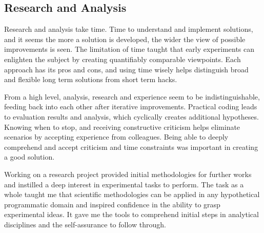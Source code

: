 \subsection{Research and Analysis}

Research and analysis take time. Time to understand and implement solutions, and it seems the more a solution is developed, the wider the view of possible improvements is seen. The limitation of time taught that early experiments can enlighten the subject by creating quantifiably comparable viewpoints. Each approach has its pros and cons, and using time wisely helps distinguish broad and flexible long term solutions from short term hacks. 

From a high level, analysis, research and experience seem to be indistinguishable, feeding back into each other after iterative improvements. Practical coding leads to evaluation results and analysis, which cyclically creates additional hypotheses. Knowing when to stop, and receiving constructive criticism helps eliminate scenarios by accepting experience from colleagues. Being able to deeply comprehend and accept criticism and time constraints was important in creating a good solution.

Working on a research project provided initial methodologies for further works and instilled a deep interest in experimental tasks to perform. The task as a whole taught me that scientific methodologies can be applied in any hypothetical programmatic domain and inspired confidence in the ability to grasp experimental ideas. It gave me the tools to comprehend initial steps in analytical disciplines and the self-assurance to follow through.
